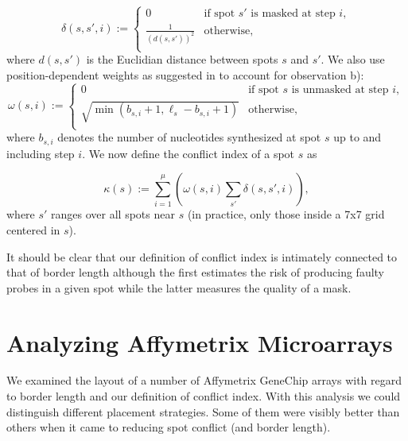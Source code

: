 \documentclass{llncs}
\begin{document}
\begin{equation}
\label{eq:dist_weight} \delta(s,s',i) :=
        \left\{
                \begin{array}{ll}
                        0 & \mbox{if spot $s'$ is masked at step $i$}, \\
                        \frac{1}{(d(s,s'))^{2}} & \mbox{otherwise}, \\
                \end{array}
        \right.
\end{equation}
where $d(s,s')$ is the Euclidian distance between spots $s$ and $s'$. We also use position-dependent weights as suggested in \cite{KAHNG03} to account for observation b):
\begin{equation}
\label{eq:pos_mult} \omega(s,i) :=
        \left\{
                \begin{array}{ll}
                        0 & \mbox{if spot $s$ is unmasked at step $i$}, \\
                        \sqrt{\min(b_{s,i} + 1,\ell_{s} - b_{s,i} + 1)} & \mbox{otherwise}, \\
                \end{array}
        \right.
\end{equation}
where $b_{s,i}$ denotes the number of nucleotides synthesized at spot $s$ up to and including step $i$. We now define the conflict index of a spot $s$ as

\begin{equation}
\label{eq:conf_idx} \kappa(s) := \sum_{i=1}^{\mu} \left( \omega(s,i) \sum_{s'} \delta(s,s',i) \right),
\end{equation}
where $s'$ ranges over all spots near $s$ (in practice, only those inside a 7x7 grid centered in $s$).

It should be clear that our definition of conflict index is intimately connected to that of border length although the first estimates the risk of producing faulty probes in a given spot while the latter measures the quality of a mask.

\section{Analyzing Affymetrix Microarrays}

We examined the layout of a number of Affymetrix GeneChip\raisebox{.6ex}{\scriptsize \textregistered} arrays with regard to border length and our definition of conflict index. With this analysis we could distinguish different placement strategies. Some of them were visibly better than others when it came to reducing spot conflict (and border length).
\end{document}
